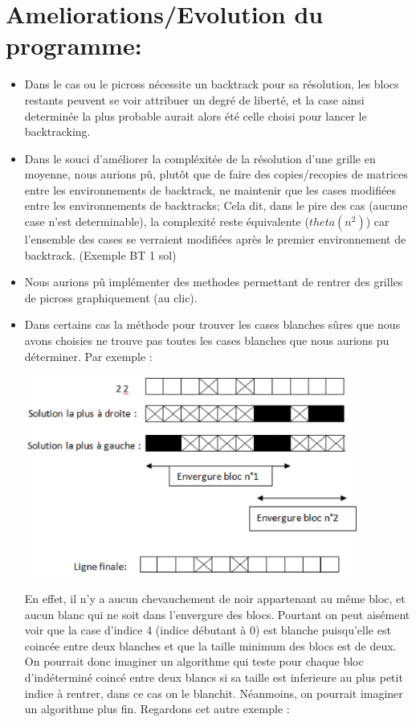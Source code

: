 \documentclass{article}
\begin{document}
\section{Ameliorations/Evolution du programme:}
\begin{itemize}
\item Dans le cas ou le picross nécessite un backtrack pour sa résolution, les blocs restants peuvent se voir attribuer un degré de liberté, et la case ainsi determinée la plus probable aurait alors été celle choisi pour lancer le backtracking.
\item Dans le souci d'améliorer la compléxitée de la résolution d'une grille en moyenne, nous aurions pû, plutôt que de faire des copies/recopies de matrices entre les environnements de backtrack, ne maintenir que les cases modifiées entre les environnements de backtracks;
Cela dit, dans le pire des cas (aucune case n'est determinable), la complexité reste équivalente ($theta(n^2)$) car l'ensemble des cases se verraient modifiées après le premier environnement de backtrack. (Exemple BT 1 sol)
\item Nous aurions pû implémenter des methodes permettant de rentrer des grilles de picross graphiquement (au clic).
\item Dans certains cas la méthode pour trouver les cases blanches sûres que nous avons choisies ne trouve pas toutes les cases blanches que nous aurions pu déterminer. Par exemple :
\begin{center}
\includegraphics[width=11cm]{image1}
\end{center}
En effet, il n’y a aucun chevauchement de noir appartenant au même bloc, et aucun blanc qui ne soit dans l’envergure des blocs. Pourtant on peut aisément voir que la case d’indice 4 (indice débutant à 0) est blanche puisqu’elle est coincée entre deux blanches et que la taille minimum des blocs est de deux. On pourrait donc imaginer un algorithme qui teste pour chaque bloc d’indéterminé coincé entre deux blancs si sa taille est inferieure au plus petit indice à rentrer,  dans ce cas on le blanchit. Néanmoins, on pourrait imaginer un algorithme plus fin. Regardons cet autre exemple :

\end{itemize}
\end{document}
